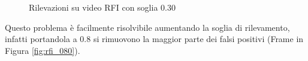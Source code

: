 \begin{figure}[]
    \begin{minipage}{.5\linewidth}
        \centering
    \end{minipage}%
    \begin{minipage}{.5\linewidth}
        \centering
    \end{minipage}
    \centering
    \caption{Rilevazioni su video RFI con soglia 0.30}
    \label{fig:rfi_030}
\end{figure}

Questo problema è facilmente risolvibile aumentando la soglia di rilevamento, infatti portandola a $0.8$ si rimuovono la maggior parte dei falsi positivi (Frame in Figura \ref{fig:rfi_080}). 

